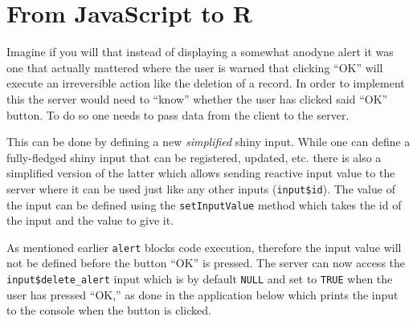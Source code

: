 \documentclass[
]{krantz}
\makeatletter
\newenvironment{Shaded}{\begin{snugshade}}{\end{snugshade}}
\newcommand{\KeywordTok}[1]{\textcolor[rgb]{0.27,0.27,0.27}{\textbf{#1}}}
\newcommand{\NormalTok}[1]{#1}
\newcommand{\OperatorTok}[1]{\textcolor[rgb]{0.43,0.43,0.43}{\textbf{#1}}}
\newcommand{\StringTok}[1]{\textcolor[rgb]{0.5,0.5,0.5}{#1}}
\newenvironment{kframe}{%
\medskip{}
\setlength{\fboxsep}{.8em}
 \def\at@end@of@kframe{}%
 \ifinner\ifhmode%
  \def\at@end@of@kframe{\end{minipage}}%
  \begin{minipage}{\columnwidth}%
 \fi\fi%
 \def\FrameCommand##1{\hskip\@totalleftmargin \hskip-\fboxsep
 \colorbox{shadecolor}{##1}\hskip-\fboxsep
     \hskip-\linewidth \hskip-\@totalleftmargin \hskip\columnwidth}%
 \MakeFramed {\advance\hsize-\width
   \@totalleftmargin\z@ \linewidth\hsize
   \@setminipage}}%
 {\par\unskip\endMakeFramed%
 \at@end@of@kframe}
\renewenvironment{Shaded}{\begin{kframe}}{\end{kframe}}
\makeatother
\begin{document}
\hypertarget{from-javascript-to-r}{%
\section*{From JavaScript to R}\label{from-javascript-to-r}}


Imagine if you will that instead of displaying a somewhat anodyne alert it was one that actually mattered where the user is warned that clicking ``OK'' will execute an irreversible action like the deletion of a record. In order to implement this the server would need to ``know'' whether the user has clicked said ``OK'' button. To do so one needs to pass data from the client to the server.

This can be done by defining a new \emph{simplified} shiny input. While one can define a fully-fledged shiny input that can be registered, updated, etc. there is also a simplified version of the latter which allows sending reactive input value to the server where it can be used just like any other inputs (\texttt{input\$id}). The value of the input can be defined using the \texttt{setInputValue} method which takes the id of the input and the value to give it.

\begin{Shaded}
\end{Shaded}

As mentioned earlier \texttt{alert} blocks code execution, therefore the input value will not be defined before the button ``OK'' is pressed. The server can now access the \texttt{input\$delete\_alert} input which is by default \texttt{NULL} and set to \texttt{TRUE} when the user has pressed ``OK,'' as done in the application below which prints the input to the console when the button is clicked.
\end{document}
